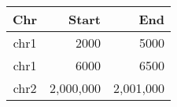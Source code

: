 \begin{tabular}{crr}
  \hline
  Chr & Start & End\\\hline
  chr1 & 2000 & 5000\\
  chr1 & 6000 & 6500\\
  chr2 & 2,000,000 & 2,001,000\\\hline
\end{tabular}
